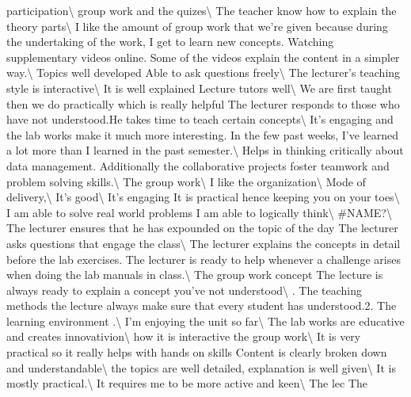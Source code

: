 \documentclass[
]{article}
\begin{document}
participation\textbackslash{} \hline group work and the
quizes\textbackslash{} \hline The teacher know how to explain the theory
parts\textbackslash{} \hline I like the amount of group work that we're
given because during the undertaking of the work, I get to learn new
concepts. Watching supplementary videos online. Some of the videos
explain the content in a simpler way.\textbackslash{} \hline Topics well
developed Able to ask questions freely\textbackslash{} \hline The
lecturer's teaching style is interactive\textbackslash{} \hline It is
well explained Lecture tutors well\textbackslash{} \hline We are first
taught then we do practically which is really helpful The lecturer
responds to those who have not understood.He takes time to teach certain
concepts\textbackslash{} \hline It's engaging and the lab works make it
much more interesting. In the few past weeks, I've learned a lot more
than I learned in the past semester.\textbackslash{} \hline Helps in
thinking critically about data management. Additionally the
collaborative projects foster teamwork and problem solving
skills.\textbackslash{} \hline The group work\textbackslash{} \hline I
like the organization\textbackslash{} \hline Mode of
delivery,\textbackslash{} \hline It's good\textbackslash{} \hline It's
engaging It is practical hence keeping you on your toes\textbackslash{}
\hline I am able to solve real world problems I am able to logically
think\textbackslash{} \hline \#NAME?\textbackslash{} \hline The lecturer
ensures that he has expounded on the topic of the day The lecturer asks
questions that engage the class\textbackslash{} \hline The lecturer
explains the concepts in detail before the lab exercises. The lecturer
is ready to help whenever a challenge arises when doing the lab manuals
in class.\textbackslash{} \hline The group work concept The lecture is
always ready to explain a concept you've not understood\textbackslash{}
. The teaching methods the lecture always make sure that every student
has understood.2. The learning environment .\textbackslash{} \hline I'm
enjoying the unit so far\textbackslash{} \hline The lab works are
educative and creates innovativion\textbackslash{} \hline how it is
interactive the group work\textbackslash{} \hline It is very practical
so it really helps with hands on skills Content is clearly broken down
and understandable\textbackslash{} \hline the topics are well detailed,
explanation is well given\textbackslash{} \hline It is mostly
practical.\textbackslash{} \hline It requires me to be more active and
keen\textbackslash{} \hline The lec The \vphantom{1}
\end{document}
